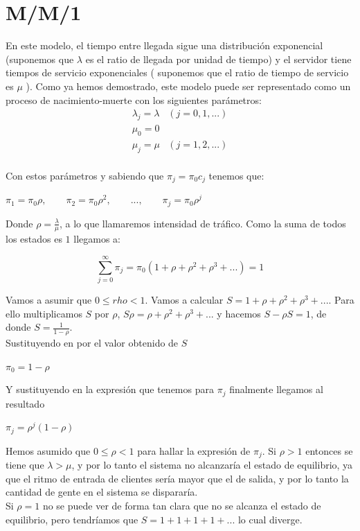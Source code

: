 \section{M/M/1}
En este modelo, el tiempo entre llegada sigue una distribuci\'on exponencial (suponemos que $\lambda$ es el ratio de llegada por unidad de tiempo) y el servidor tiene tiempos de servicio exponenciales ( suponemos que el ratio de tiempo de servicio es $\mu$ ). Como ya hemos demostrado, este modelo puede ser representado como un proceso de nacimiento-muerte con los siguientes par\'ametros:
	$$\begin{array}{cc}
	\lambda_j=\lambda & (j=0,1,...)\\
	\mu_0=0 &  \\
	\mu_j=\mu &  (j=1,2,...)\\
	\end{array}$$
	
Con estos par\'ametros y sabiendo que $\pi_j=\pi_0 c_j$ tenemos que:
	\begin{center}
		$\pi_1=\pi_0\rho, \qquad \pi_2=\pi_0\rho^2, \qquad...,\qquad\pi_j=\pi_0\rho^j$
	 
	\end{center}
\hspace{0.5cm}Donde $\rho=\frac{\lambda}{\mu}$, a lo que llamaremos intensidad de tr\'afico. Como la suma de todos los estados es $1$ llegamos a:
	\begin{center}
		$$\sum_{j=0}^{\infty}\pi_j=\pi_0(1+ \rho +\rho^2+\rho^3+...)=1$$
	\end{center}
\hspace{0.5cm}Vamos a asumir que $0\leq rho<1$. Vamos a calcular $S=1+ \rho +\rho^2+\rho^3+...$. Para ello multiplicamos $S$ por $\rho$, $S\rho=\rho+\rho^2+\rho^3+...$ y hacemos $S-\rho S=1$, de donde $S=\frac{1}{1-\rho}$.\\
\hspace{0.5cm}Sustituyendo en por el valor obtenido de $S$
	\begin{center}
		$\pi_0=1-\rho$
	\end{center}
\hspace{0.5cm}Y sustituyendo en la expresi\'on que tenemos para $\pi_j$ finalmente llegamos al resultado
	\begin{center}
		$\pi_j=\rho^j(1-\rho)$
	\end{center}
\hspace{0.5cm}Hemos asumido que $0\leq\rho<1$ para hallar la expresi\'on de $\pi_j$. Si $\rho>1$ entonces se tiene que $\lambda>\mu$, y por lo tanto el sistema no alcanzar\'ia el estado de equilibrio, ya que el ritmo de entrada de clientes ser\'ia mayor que el de salida, y por lo tanto la cantidad de gente en el sistema se disparar\'ia.\\
\hspace{0.5cm}Si $\rho=1$ no se puede ver de forma tan clara que no se alcanza el estado de equilibrio, pero tendr\'iamos que $S=1+1+1+1+...$ lo cual diverge.
